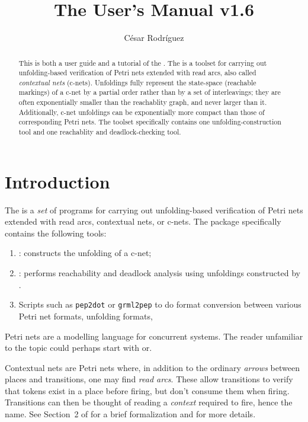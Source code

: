 \documentclass[a4paper]{refart}
\title{The \cunft{} User's Manual \hfill v1.6}
\author{C\'esar Rodr\'iguez}
\begin{document}
\maketitle

\begin{abstract}
This is both a user guide and a tutorial of the \cunft{}.
The \cunft{} is a toolset for carrying out unfolding-based
verification of Petri nets extended with read arcs, also called
\emph{contextual nets} (c-nets).
Unfoldings fully represent the state-space (reachable markings) of a c-net
by a partial order rather than by a set of interleavings;
they are often exponentially smaller than the reachablity graph, and never
larger than it.
Additionally, c-net unfoldings can be exponentially more compact than
those of corresponding Petri nets.
The toolset specifically contains one unfolding-construction
tool and one reachablity and deadlock-checking tool.
\end{abstract}

\tableofcontents

\section{Introduction}%
\label{s:intro}

The \emph{\cunft{}} is a \emph{set}
of programs for carrying out unfolding-based
verification of Petri nets extended with read arcs, \aka contextual
nets, or c-nets.  The package specifically contains the following tools:
\begin{enumerate}
\item
  \cunf: constructs the unfolding of a c-net;
\item
  \cna: performs reachability and deadlock analysis using unfoldings
  constructed by \cunf.
\item
  Scripts such as \verb!pep2dot! or \verb!grml2pep! to do format conversion
  between various Petri net formats, unfolding formats, \etc
\end{enumerate}

Petri nets are a modelling language for concurrent systems.
The reader unfamiliar to the topic could perhaps start with\cite{wiki:pn}
or\cite{Mur89}.

Contextual nets are Petri nets where, in addition to the ordinary
\textit{arrows} between places and transitions, one may find
\emph{read arcs}.
These allow transitions to verify that
tokens exist in a place before firing, but don't consume them
when firing.
Transitions can then be thought of reading a
\emph{context} required to fire, hence the name.
See Section~2 of\cite{BBCKRS12} for a brief formalization
and\cite{MR95} for more details.
\end{document}
